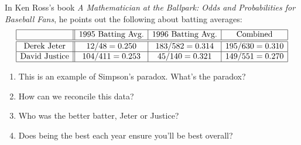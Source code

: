 \documentclass[nooutcomes,noauthor,hints,handout]{ximera}
\begin{document}
\begin{question}
In Ken Ross's book \textit{A Mathematician at the Ballpark: Odds and Probabilities for Baseball Fans}, he points out the following about batting averages:
\[
\begin{array}{|c||c|c|c|} \hline
 & 1995~\text{Batting Avg.} & 1996~\text{Batting Avg.}& \text{Combined}\\ \hline\hline
\text{Derek Jeter} & 12/48 = 0.250 & 183/582 = 0.314 & 195/630 =0.310\\ \hline
\text{David Justice} & 104/411=0.253 & 45/140=0.321  & 149/551 = 0.270\\ \hline
\end{array}
\]
\begin{enumerate}
\item This is an example of Simpson's paradox. What's the paradox?
\item How can we reconcile this data?
\item Who was the better batter, Jeter or Justice?
\item Does being the best each year ensure you'll be best overall?
\end{enumerate}
\end{question}
\mynewpage
\end{document}
